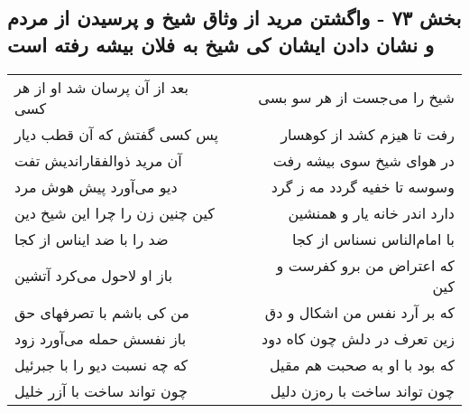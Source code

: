 \begin{center}
\section*{بخش ۷۳ - واگشتن مرید از وثاق شیخ و پرسیدن از مردم و نشان دادن ایشان کی شیخ به فلان بیشه رفته است}
\label{sec:sh073}
\begin{longtable}{l p{0.5cm} r}
بعد از آن پرسان شد او از هر کسی
&&
شیخ را می‌جست از هر سو بسی
\\
پس کسی گفتش که آن قطب دیار
&&
رفت تا هیزم کشد از کوهسار
\\
آن مرید ذوالفقاراندیش تفت
&&
در هوای شیخ سوی بیشه رفت
\\
دیو می‌آورد پیش هوش مرد
&&
وسوسه تا خفیه گردد مه ز گرد
\\
کین چنین زن را چرا این شیخ دین
&&
دارد اندر خانه یار و همنشین
\\
ضد را با ضد ایناس از کجا
&&
با امام‌الناس نسناس از کجا
\\
باز او لاحول می‌کرد آتشین
&&
که اعتراض من برو کفرست و کین
\\
من کی باشم با تصرفهای حق
&&
که بر آرد نفس من اشکال و دق
\\
باز نفسش حمله می‌آورد زود
&&
زین تعرف در دلش چون کاه دود
\\
که چه نسبت دیو را با جبرئیل
&&
که بود با او به صحبت هم مقیل
\\
چون تواند ساخت با آزر خلیل
&&
چون تواند ساخت با ره‌زن دلیل
\\
\end{longtable}
\end{center}
